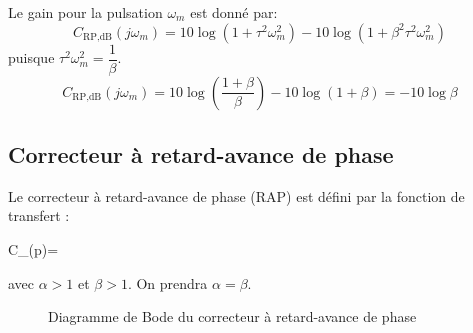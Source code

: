 Le gain pour la pulsation $\omega_m$ est donné par:
\[
    C_{\text{RP},\si{\dB}}(j\omega_m)=10\log{(1+\tau^2\omega_m^2)}-
                               10\log{(1+\beta^2\tau^2\omega_m^2)}
\]
puisque $\tau^2\omega_m^2=\dfrac{1}{\beta}$.
\[
    C_{\text{RP},\si{\dB}}(j\omega_m)
    =10\log{\left(\dfrac{1+\beta}{\beta}\right)}
    -10\log{\left(1+\beta\right)}=-10\log{\beta}
\]
\subsection{Correcteur à retard-avance de phase}
Le correcteur à retard-avance de phase (RAP) est défini par la fonction 
de transfert :
\begin{bequation}
    C_{}(p)=\cdot
\end{bequation}
avec $\alpha>1$ et $\beta>1$. On prendra $\alpha=\beta$.
\begin{figure}
    \centering
    
    
    
    \caption{Diagramme de Bode du correcteur à retard-avance de phase}
\end{figure}
